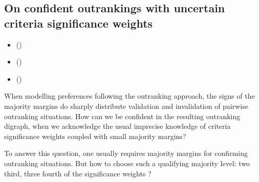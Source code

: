 \documentclass[a4paper,12pt,english]{sphinxhowto}
\begin{document}
\subsection{On confident outrankings with uncertain criteria significance weights}
\label{\detokenize{pearls:on-confident-outrankings-with-uncertain-criteria-significance-weights}}\label{\detokenize{pearls:bipolar-valued-likelihood-tutorial-label}}
\begin{sphinxcontents}
\begin{itemize}
\item {} 
\sphinxAtStartPar
{}\label{\detokenize{pearls:id110}}{\hyperref[\detokenize{pearls:modelling-uncertain-criteria-significance-weights}]{}} ()

\item {} 
\sphinxAtStartPar
{}\label{\detokenize{pearls:id111}}{\hyperref[\detokenize{pearls:bipolar-valued-likelihood-of-at-least-as-good-as-situations}]{}} ()

\item {} 
\sphinxAtStartPar
{}\label{\detokenize{pearls:id112}}{\hyperref[\detokenize{pearls:confidence-level-of-outranking-situations}]{}} ()

\end{itemize}
\end{sphinxcontents}

\sphinxAtStartPar
When modelling preferences following the outranking approach, the signs of the majority margins do sharply distribute validation and invalidation of pairwise outranking situations. How can we be confident in the resulting outranking digraph, when we acknowledge the usual imprecise knowledge of criteria significance weights coupled with small majority margins?

\sphinxAtStartPar
To answer this question, one usually requires  majority margins for confirming outranking situations. But how to choose such a qualifying majority level: two third, three fourth of the significance weights ?
\end{document}
